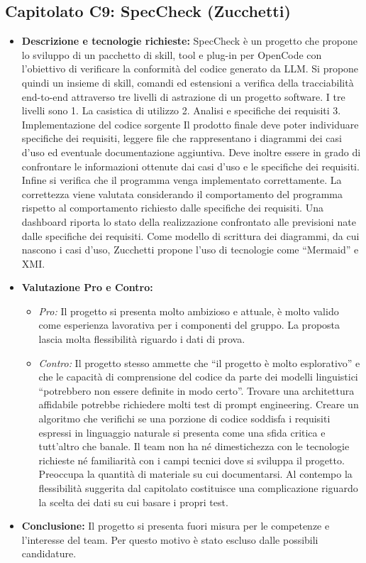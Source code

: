\documentclass[12pt,a4paper]{article}
\newcommand{\tightlist}{\setlength{\itemsep}{1pt}\setlength{\parskip}{0pt}}
\begin{document}
\hypertarget{capitolato-c9}{%
\subsection{Capitolato C9: SpecCheck (Zucchetti)}}
\begin{itemize}
\tightlist
\item \textbf{Descrizione e tecnologie richieste:} SpecCheck è un progetto che propone lo sviluppo di un pacchetto di skill, tool e plug-in per OpenCode con l’obiettivo di verificare la conformità del codice generato da LLM. 
Si propone quindi un insieme di skill, comandi ed estensioni a verifica della tracciabilità end-to-end attraverso tre livelli di astrazione di un progetto software. I tre livelli sono 1. La casistica di utilizzo 2. Analisi e specifiche dei requisiti 3. Implementazione del codice sorgente 
Il prodotto finale deve poter individuare specifiche dei requisiti, leggere file che rappresentano i diagrammi dei casi d’uso ed eventuale documentazione aggiuntiva. Deve inoltre essere in grado di confrontare le informazioni ottenute dai casi d’uso e le specifiche dei requisiti.
Infine si verifica che il programma venga implementato correttamente. La correttezza viene valutata considerando il comportamento del programma rispetto al comportamento richiesto dalle specifiche dei requisiti. 
Una dashboard riporta lo stato della realizzazione confrontato alle previsioni nate dalle specifiche dei requisiti.
Come modello di scrittura dei diagrammi, da cui nascono i casi d’uso, Zucchetti propone l’uso di tecnologie come “Mermaid” e XMI. 

\item \textbf{Valutazione Pro e Contro:}
  \begin{itemize}
  \tightlist
  \item \emph{Pro:} Il progetto si presenta molto ambizioso e attuale, è molto valido come esperienza lavorativa per i componenti del gruppo. 
La proposta lascia molta flessibilità riguardo i dati di prova.

  \item \emph{Contro:} Il progetto stesso ammette che “il progetto è molto esplorativo” e che le capacità di comprensione del codice da parte dei modelli linguistici “potrebbero non essere definite in modo certo”. Trovare una architettura affidabile potrebbe richiedere molti test di prompt engineering.
Creare un algoritmo che verifichi se una porzione di codice soddisfa i requisiti espressi in linguaggio naturale si presenta come una sfida critica e tutt’altro che banale.
Il team non ha né dimestichezza con le tecnologie richieste né familiarità con i campi tecnici dove si sviluppa il progetto.
Preoccupa la quantità di materiale su cui documentarsi.
Al contempo la flessibilità suggerita dal capitolato costituisce una complicazione riguardo la scelta dei dati su cui basare i propri test.

  \end{itemize}
\item \textbf{Conclusione:} Il progetto si presenta fuori misura per le competenze e l’interesse del team. Per questo motivo è stato escluso dalle possibili candidature.
\end{itemize}
\end{document}
